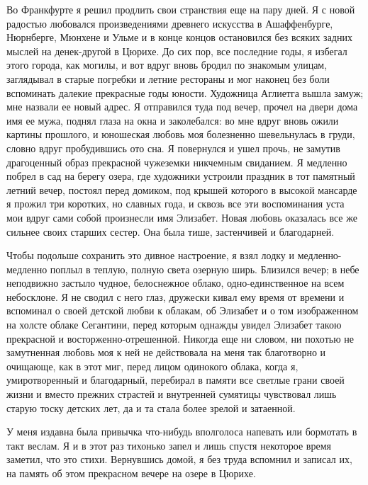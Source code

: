 Во  Франкфурте я  решил продлить  свои  странствия еще  на пару  дней.
Я  с  новой радостью  любовался  произведениями  древнего искусства  в
Ашаффенбурге, Нюрнберге, Мюнхене и Ульме  и в конце концов остановился
без всяких  задних мыслей на  денек-другой в  Цюрихе. До сих  пор, все
последние годы, я избегал этого города,  как могилы, и вот вдруг вновь
бродил  по знакомым  улицам,  заглядывал в  старые  погребки и  летние
рестораны и  мог наконец без  боли вспоминать далекие  прекрасные годы
юности. Художница Аглиетга вышла замуж;  мне назвали ее новый адрес. Я
отправился туда  под вечер, прочел на  двери дома имя ее  мужа, поднял
глаза  на  окна  и  заколебался:  во мне  вдруг  вновь  ожили  картины
прошлого,  и юношеская  любовь  моя болезненно  шевельнулась в  груди,
словно  вдруг пробудившись  ото сна.  Я  повернулся и  ушел прочь,  не
замутив драгоценный образ прекрасной  чужеземки никчемным свиданием. Я
медленно побрел в сад на берегу озера, где художники устроили праздник
в  тот  памятный  летний  вечер, постоял  перед  домиком,  под  крышей
которого в высокой мансарде я прожил  три коротких, но славных года, и
сквозь все эти  воспоминания уста мои вдруг сами  собой произнесли имя
Элизабет. Новая любовь оказалась все  же сильнее своих старших сестер.
Она была тише, застенчивей и благодарней.

Чтобы  подольше  сохранить  это  дивное настроение,  я  взял  лодку  и
медленно-медленно  поплыл   в  теплую,  полную  света   озерную  ширь.
Близился вечер; в небе  неподвижно застыло чудное, белоснежное облако,
одно-единственное  на  всем  небосклоне.  Я не  сводил  с  него  глаз,
дружески кивал ему время от времени  и вспоминал о своей детской любви
к  облакам,  об  Элизабет  и  о  том  изображенном  на  холсте  облаке
Сегантини,  перед которым  однажды  увидел  Элизабет такою  прекрасной
и  восторженно-отрешенной.  Никогда  еще  ни  словом,  ни  похотью  не
замутненная любовь моя к ней не  действовала на меня так благотворно и
очищающе,  как в  этот миг,  перед  лицом одинокого  облака, когда  я,
умиротворенный  и благодарный,  перебирал в  памяти все  светлые грани
своей жизни и вместо прежних страстей и внутренней сумятицы чувствовал
лишь старую тоску детских лет, да и та стала более зрелой и затаенной.

У  меня  издавна  была  привычка что-нибудь  вполголоса  напевать  или
бормотать в такт веслам.  Я и в этот раз тихонько  запел и лишь спустя
некоторое время заметил, что это  стихи. Вернувшись домой, я без труда
вспомнил и записал их, на память  об этом прекрасном вечере на озере в
Цюрихе.

